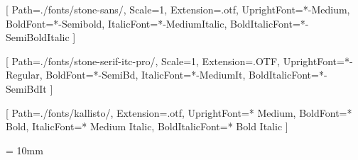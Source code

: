 \usepackage{microtype}
\usepackage{setspace}

\setlength{\parskip}{0em}
\setlength{\parindent}{1em}

\setstocksize{210mm}{148mm}
\settrimmedsize{210mm}{148mm}{*}
\setbinding{8mm}
\setlrmarginsandblock{10mm}{18mm}{*}
\setulmarginsandblock{22mm}{28mm}{*}

\usepackage{fontspec}

\setsansfont{stone-sans}[
    Path=./fonts/stone-sans/,
    Scale=1,
    Extension=.otf,
    UprightFont=*-Medium,
    BoldFont=*-Semibold,
    ItalicFont=*-MediumItalic,
    BoldItalicFont=*-SemiBoldItalic
]

\setmainfont{stone-serif}[
    Path=./fonts/stone-serif-itc-pro/,
    Scale=1,
    Extension=.OTF,
    UprightFont=*-Regular,
    BoldFont=*-SemiBd,
    ItalicFont=*-MediumIt,
    BoldItalicFont=*-SemiBdIt
]

[
  Path=./fonts/kallisto/,
  Extension=.otf,
  UprightFont=* Medium,
  BoldFont=* Bold,
  ItalicFont=* Medium Italic,
  BoldItalicFont=* Bold Italic
]

\usepackage{lettrine}
\setcounter{DefaultLines}{3}
\renewcommand{\DefaultLoversize}{0.1}
\renewcommand{\DefaultLraise}{0}
\renewcommand{\LettrineTextFont}{}
\setlength{\DefaultFindent}{\fontdimen2\font}
\setlength{\DefaultNindent}{0em}




\nouppercaseheads
\headsep = 10mm
\makeatletter

\pagestyle{mystyle}

\newif\ifmainmatter
\appto\mainmatter{\mainmattertrue}
\appto\backmatter{\mainmatterfalse}
\appto\appendix{\mainmatterfalse}

